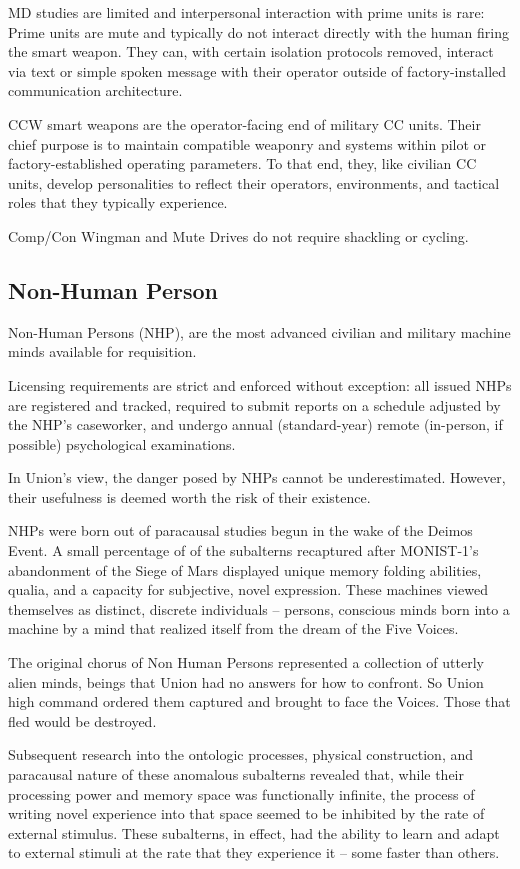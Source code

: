 MD studies are limited and interpersonal interaction with prime units is rare: Prime units are mute
and typically do not interact directly with the human firing the smart weapon. They can, with
certain isolation protocols removed, interact via text or simple spoken message with their
operator outside of factory-installed communication architecture.

CCW smart weapons are the operator-facing end of military CC units. Their chief purpose is to
maintain compatible weaponry and systems within pilot or factory-established operating
parameters. To that end, they, like civilian CC units, develop personalities to reflect their
operators, environments, and tactical roles that they typically experience.

Comp/Con Wingman and Mute Drives do not require shackling or cycling.

\subsection{Non-Human Person}

Non-Human Persons (NHP), are the most advanced civilian and military machine minds available
for requisition.

Licensing requirements are strict and enforced without exception: all issued NHPs are registered
and tracked, required to submit reports on a schedule adjusted by the NHP's caseworker, and
undergo annual (standard-year) remote (in-person, if possible) psychological examinations.

In Union's view, the danger posed by NHPs cannot be underestimated. However, their usefulness
is deemed worth the risk of their existence.

NHPs were born out of paracausal studies begun in the wake of the Deimos Event. A small
percentage of of the subalterns recaptured after MONIST-1's abandonment of the Siege of Mars
displayed unique memory folding abilities, qualia, and a capacity for subjective, novel
expression. These machines viewed themselves as distinct, discrete individuals -- persons,
conscious minds born into a machine by a mind that realized itself from the dream of the Five
Voices.

The original chorus of Non Human Persons represented a collection of utterly alien minds, beings
that Union had no answers for how to confront. So Union high command ordered them captured
and brought to face the Voices. Those that fled would be destroyed.

Subsequent research into the ontologic processes, physical construction, and paracausal nature
of these anomalous subalterns revealed that, while their processing power and memory space
was functionally infinite, the process of writing novel experience into that space seemed to be
inhibited by the rate of external stimulus. These subalterns, in effect, had the ability to learn and
adapt to external stimuli at the rate that they experience it -- some faster than others.

